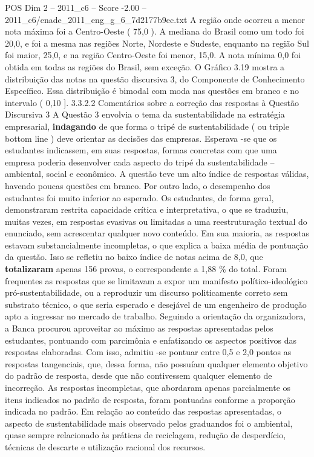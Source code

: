 \begin{textsample}{POS Dim 2 – 2011\_c6 – Score -2.00 – 2011\_c6/enade\_2011\_eng\_g\_6\_7d2177b9ec.txt}
A região onde ocorreu a menor nota máxima foi a Centro-Oeste ( 75,0 ).
A mediana do Brasil como um todo foi 20,0, e foi a mesma nas regiões Norte, Nordeste e Sudeste, enquanto na região Sul foi maior, 25,0, e na região Centro-Oeste foi menor, 15,0.
A nota mínima 0,0 foi obtida em todas as regiões do Brasil, sem exceção.
O Gráfico 3.19 mostra a distribuição das notas na questão discursiva 3, do Componente de Conhecimento Específico.
Essa distribuição é bimodal com moda nas questões em branco e no intervalo ( 0,10 ]. 3.3.2.2 Comentários sobre a correção das respostas à Questão Discursiva 3 A Questão 3 envolvia o tema da sustentabilidade na estratégia empresarial, \textbf{indagando} de que forma o tripé de sustentabilidade ( ou triple bottom line ) deve orientar as decisões das empresas.
Esperava -se que os estudantes indicassem, em suas respostas, formas concretas com que uma empresa poderia desenvolver cada aspecto do tripé da sustentabilidade – ambiental, social e econômico.
A questão teve um alto índice de respostas válidas, havendo poucas questões em branco.
Por outro lado, o desempenho dos estudantes foi muito inferior ao esperado.
Os estudantes, de forma geral, demonstraram restrita capacidade crítica e interpretativa, o que se traduziu, muitas vezes, em respostas evasivas ou limitadas a uma reestruturação textual do enunciado, sem acrescentar qualquer novo conteúdo.
Em sua maioria, as respostas estavam substancialmente incompletas, o que explica a baixa média de pontuação da questão.
Isso se refletiu no baixo índice de notas acima de 8,0, que \textbf{totalizaram} apenas 156 provas, o correspondente a 1,88 \% do total.
Foram frequentes as respostas que se limitavam a expor um manifesto político-ideológico pró-sustentabilidade, ou a reproduzir um discurso politicamente correto sem substrato técnico, o que seria esperado e desejável de um engenheiro de produção apto a ingressar no mercado de trabalho.
Seguindo a orientação da organizadora, a Banca procurou aproveitar ao máximo as respostas apresentadas pelos estudantes, pontuando com parcimônia e enfatizando os aspectos positivos das respostas elaboradas.
Com isso, admitiu -se pontuar entre 0,5 e 2,0 pontos as respostas tangenciais, que, dessa forma, não possuíam qualquer elemento objetivo do padrão de resposta, desde que não contivessem qualquer elemento de incorreção.
As respostas incompletas, que abordaram apenas parcialmente os itens indicados no padrão de resposta, foram pontuadas conforme a proporção indicada no padrão.
Em relação ao conteúdo das respostas apresentadas, o aspecto de sustentabilidade mais observado pelos graduandos foi o ambiental, quase sempre relacionado às práticas de reciclagem, redução de desperdício, técnicas de descarte e utilização racional dos recursos.

\end{textsample}
